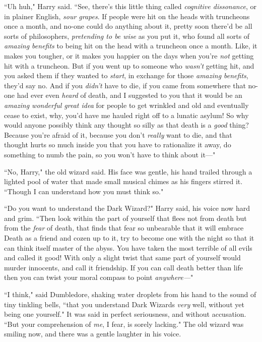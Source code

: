 ``Uh huh," Harry said. ``See, there's this little thing called \emph{cognitive dissonance}, or in plainer English, \emph{sour grapes}. If people were hit on the heads with truncheons once a month, and no-one could do anything about it, pretty soon there'd be all sorts of philosophers, \emph{pretending to be wise} as you put it, who found all sorts of \emph{amazing benefits} to being hit on the head with a truncheon once a month. Like, it makes you tougher, or it makes you happier on the days when you're \emph{not} getting hit with a truncheon. But if you went up to someone who \emph{wasn't} getting hit, and you asked them if they wanted to \emph{start}, in exchange for those \emph{amazing benefits}, they'd say no. And if you \emph{didn't} have to die, if you came from somewhere that no-one had ever even \emph{heard} of death, and I suggested to you that it would be an \emph{amazing wonderful great idea} for people to get wrinkled and old and eventually cease to exist, why, you'd have me hauled right off to a lunatic asylum! So why would anyone possibly think any thought so silly as that death is a \emph{good} thing? Because you're afraid of it, because you don't \emph{really} want to die, and that thought hurts so much inside you that you have to rationalize it away, do something to numb the pain, so you won't have to think about it—"

``No, Harry," the old wizard said. His face was gentle, his hand trailed through a lighted pool of water that made small musical chimes as his fingers stirred it. ``Though I can understand how you must think so."

``Do you want to understand the Dark Wizard?" Harry said, his voice now hard and grim. ``Then look within the part of yourself that flees not from death but from the \emph{fear} of death, that finds that fear so unbearable that it will embrace Death as a friend and cozen up to it, try to become one with the night so that it can think itself master of the abyss. You have taken the most terrible of all evils and called it good! With only a slight twist that same part of yourself would murder innocents, and call it friendship. If you can call death better than life then you can twist your moral compass to point \emph{anywhere—}"

``I think," said Dumbledore, shaking water droplets from his hand to the sound of tiny tinkling bells, ``that you understand Dark Wizards \emph{very} well, without yet being one yourself." It was said in perfect seriousness, and without accusation. ``But your comprehension of \emph{me}, I fear, is sorely lacking." The old wizard was smiling now, and there was a gentle laughter in his voice.

